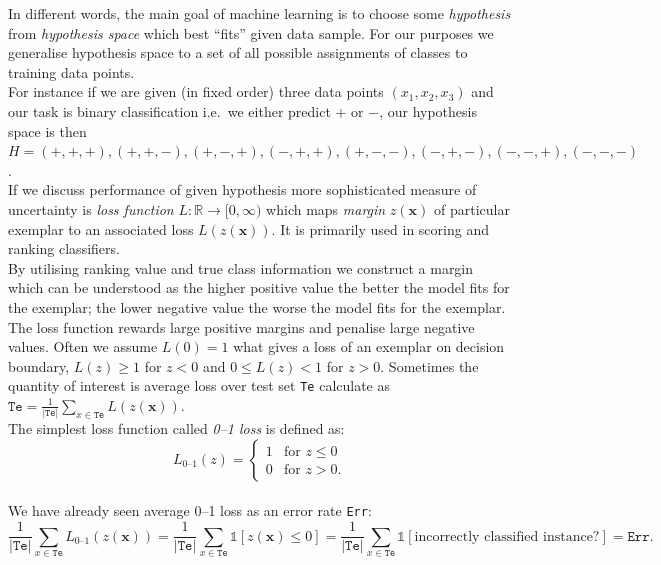 \documentclass[12pt, a4paper, pdflatex]{report}
\begin{document}
In different words, the main goal of machine learning is to choose some \emph{hypothesis} from \emph{hypothesis space} which best ``fits'' given data sample. For our purposes we generalise hypothesis space to a set of all possible assignments of classes to training data points.\\
For instance if we are given (in fixed order) three data points $(x_1, x_2, x_3)$ and our task is binary classification i.e.\ we either predict $+$ or $-$, our hypothesis space is then $H = {(+, +, +), (+, +, -), (+, -, +), (-, +, +), (+, -, -), (-, +, -), (-, -, +), (-, -, -)}$.\\

If we discuss performance of given hypothesis more sophisticated measure of uncertainty is \emph{loss function} $L : \mathbb{R} \rightarrow [0, \infty)$ which maps \emph{margin} $z(\mathbf{x})$ of particular exemplar to an associated loss $L(z(\mathbf{x}))$. It is primarily used in scoring and ranking classifiers.\\
By utilising ranking value and true class information we construct a margin which can be understood as the higher positive value the better the model fits for the exemplar; the lower negative value the worse the model fits for the exemplar.\\
The loss function rewards large positive margins and penalise large negative values. Often we assume $L(0) = 1$ what gives a loss of an exemplar on decision boundary, $L(z) \geq 1$ for $z < 0$ and $0 \leq L(z) < 1$ for $z > 0$. Sometimes the quantity of interest is average loss over test set \texttt{Te} calculate as $\mathtt{Te} = \frac{1}{|\mathtt{Te}|} \sum_{x \in \mathtt{Te}} L(z(\mathbf{x}))$.\\
The simplest loss function called \emph{0--1 loss} is defined as:
\[
 L_{\text{0--1}} (z) =
  \begin{cases}
   1 & \text{for } z \leq 0 \\
   0 & \text{for } z > 0 \text{.}
  \end{cases}
\]~\\
We have already seen average 0--1 loss as an error rate \texttt{Err}:
\[ \frac{1}{|\mathtt{Te}|} \sum_{x \in \mathtt{Te}} L_{\text{0--1}}(z(\mathbf{x})) = 
   \frac{1}{|\mathtt{Te}|} \sum_{x \in \mathtt{Te}} \mathds{1} \left[ z(\mathbf{x}) \leq 0 \right] =
   \frac{1}{|\mathtt{Te}|} \sum_{x \in \mathtt{Te}} \mathds{1} \left[ \text{incorrectly classified instance?} \right] =
   \mathtt{Err}\text{.}
\]~\\
\end{document}

